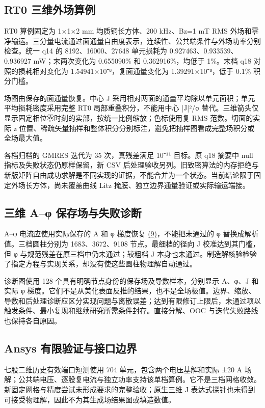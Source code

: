 \documentclass[11pt]{article}
\begin{document}
\subsection*{RT0 三维外场算例}
\hypertarget{S2.rt0.heading}{}
RT0 算例固定为 1×1×2 mm 均质铜长方体、200 kHz、Bz=1 mT RMS 外场和零净输运。三分量电流通过面通量自由度表示，连续性、公共端条件与外场功率分别检查。统一 q14 的 8192、16000、27648 单元损耗为 0.927463、0.933539、0.936927 mW；末两次变化为 0.655090\% 和 0.362916\%，均低于 1\%。末档 q18 对照的损耗相对变化为 1.54941×10⁻⁸，复面通量变化为 1.39291×10⁻⁸，低于 0.1\% 积分门槛。


场图由保存的面通量恢复。中心 J 采用相对两面的通量平均除以单元面积；单元平均损耗密度采用完整 RT0 局部重叠积分，不能用中心 |J|²/σ 替代。三维箭头仅显示固定相位零时刻的实部，按统一比例缩放；色标使用复 RMS 范数。切面的实际 z 位置、稀疏矢量抽样和整体积分分别标注，避免把抽样图看成完整场积分或全场最大值。


各档归档的 GMRES 迭代为 35 次，真残差满足 10⁻¹¹ 目标。原 q18 摘要中 null 指标及失败状态仍原样保留，新 CSV 后处理验收另列。旧致密算法的内存拒绝与新版矩阵自由成功求解是不同实现的证据，不能合并为一个状态。当前结论限于固定外场长方体，尚未覆盖曲线 Litz 掩膜、独立边界通量验证或实际输运端接。


\subsection*{三维 A–φ 保存场与失败诊断}
\hypertarget{S2.aphi.heading}{}
A–φ 电流应使用实际保存的 A 和 φ 梯度恢复 \href{paper_zh-CN_single.pdf#E07}{(9)}，不能把未通过的 φ 替换成解析值。三档圆柱分别为 1683、3672、9108 节点。最细档的径向 J 校准达到其门槛，但 φ 与规范残差在原三档中仍未通过；较粗档 J 本身也未通过。制造解核验检验了指定方程与实现关系，却没有使这些圆柱物理解自动通过。


诊断图使用 128 个具有明确节点身份的保存场及导数样本，分别显示 A、φ、J 和实际 φ 梯度。它们不是从美化表面反推的结果，也不是全场极值。边界、缩放、导数和后处理诊断应区分实现问题与离散误差；达到有限修订上限后，未通过项以触发条件、最小复现和继续研究所需条件封存。直接分解、OOC 与迭代失败路线也保持各自原因。


\subsection*{Ansys 有限验证与接口边界}
\hypertarget{S2.ansys.heading}{}
七股二维历史有效端口短测使用 704 单元，包含两个电压基解和实际 ±20 A 场解；公共端电压、逐股复电流与独立功率支持该单档算例。它不是三档网格收敛。新固定网格与精度尝试未形成要求的完整验收；原生三维 J 表达式探针也未得到可接受物理解，因此不为其生成场结果图或填造数值。
\end{document}

